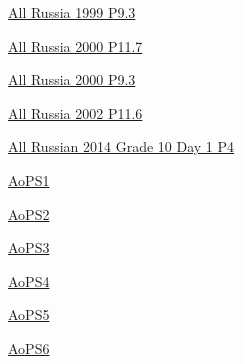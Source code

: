 \hyperref  [problem:]{}

\hyperref  [problem:]{}

\hyperref  [problem:]{}

\hyperref  [problem:]{}

\hyperref  [problem:]{}

\hyperref  [problem:]{}

\hyperref  [problem:]{}

\hyperref  [problem:]{}

\hyperref  [problem:]{}

\hyperref  [problem:]{}

\hyperref  [problem:]{}

\hyperref  [problem:]{}

\hyperref  [problem:]{}

\hyperref  [problem:]{}

\hyperref  [problem:]{}

\hyperref  [problem:]{}

\hyperref  [problem:]{}

\hyperref  [problem:]{}

\hyperref  [problem:]{}

\hyperref  [problem:]{}

\hyperref  [problem:]{}

\hyperref  [problem:]{}

\hyperref  [problem:]{}

\hyperref  [problem:]{}

\hyperref  [problem:]{}

\hyperref  [problem:All Russia 1999 P9.3]{All Russia 1999 P9.3}

\hyperref  [problem:All Russia 2000 P11.7]{All Russia 2000 P11.7}

\hyperref  [problem:All Russia 2000 P9.3]{All Russia 2000 P9.3}

\hyperref  [problem:All Russia 2002 P11.6]{All Russia 2002 P11.6}

\hyperref  [problem:All Russian 2014 Grade 10 Day 1 P4]{All Russian 2014 Grade 10 Day 1 P4}

\hyperref  [problem:AoPS1]{AoPS1}

\hyperref  [problem:AoPS2]{AoPS2}

\hyperref  [problem:AoPS3]{AoPS3}

\hyperref  [problem:AoPS4]{AoPS4}

\hyperref  [problem:AoPS5]{AoPS5}

\hyperref  [problem:AoPS6]{AoPS6}

